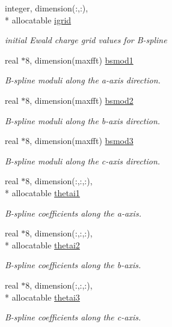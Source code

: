 \begin{DoxyCompactItemize}
integer, dimension(\-:,\-:), \\*
allocatable \hyperlink{classpme_abb9eb9e37b058bcbce7c025c3c7ae206}{igrid}
\begin{DoxyCompactList}\small\item\em initial Ewald charge grid values for B-\/spline \end{DoxyCompactList}\item 
real $\ast$8, dimension(maxfft) \hyperlink{classpme_a3d0155a6c5f49786b2a71081d6862121}{bsmod1}
\begin{DoxyCompactList}\small\item\em B-\/spline moduli along the a-\/axis direction. \end{DoxyCompactList}\item 
real $\ast$8, dimension(maxfft) \hyperlink{classpme_a0ebaead01665855789c376258ec2ca3d}{bsmod2}
\begin{DoxyCompactList}\small\item\em B-\/spline moduli along the b-\/axis direction. \end{DoxyCompactList}\item 
real $\ast$8, dimension(maxfft) \hyperlink{classpme_a5a6a1eff12e64abc65b3a5f38f2a4cc8}{bsmod3}
\begin{DoxyCompactList}\small\item\em B-\/spline moduli along the c-\/axis direction. \end{DoxyCompactList}\item 
real $\ast$8, dimension(\-:,\-:,\-:), \\*
allocatable \hyperlink{classpme_a8310f8e14534feef7810430c5398214b}{thetai1}
\begin{DoxyCompactList}\small\item\em B-\/spline coefficients along the a-\/axis. \end{DoxyCompactList}\item 
real $\ast$8, dimension(\-:,\-:,\-:), \\*
allocatable \hyperlink{classpme_a8f1f382bf6f1d281ee730f2d28592011}{thetai2}
\begin{DoxyCompactList}\small\item\em B-\/spline coefficients along the b-\/axis. \end{DoxyCompactList}\item 
real $\ast$8, dimension(\-:,\-:,\-:), \\*
allocatable \hyperlink{classpme_a4a9242f547e1368bfcf75f6e89da2127}{thetai3}
\begin{DoxyCompactList}\small\item\em B-\/spline coefficients along the c-\/axis. \end{DoxyCompactList}\item 

\end{DoxyCompactItemize}
